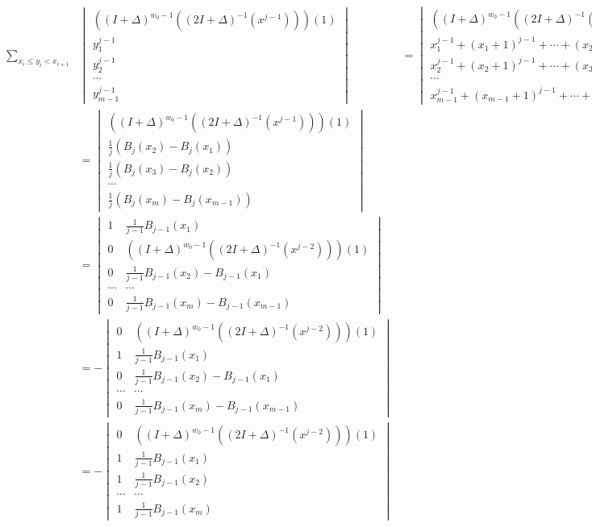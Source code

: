 \documentclass[10pt,reqno]{amsart}
\theoremstyle{plain}
\theoremstyle{definition}
\theoremstyle{remark}
\begin{document}
\begin{align}
\sum_{x_i\leq y_i<x_{i+1}} 
&\begin{vmatrix}
((I+\Delta)^{w_0-1} ((2I+\Delta)^{-1} (x^{j-1})))(1) \\
y_1^{j-1} \\
y_2^{j-1} \\
\dotsb \\
y_{m-1}^{j-1}
\end{vmatrix}\  
&=
\begin{vmatrix}
((I+\Delta)^{w_0-1} ((2I+\Delta)^{-1} (x^{j-1})))(1) \\
x_1^{j-1}+(x_1+1)^{j-1}+\dotsb + (x_2-1)^{j-1} \\
x_2^{j-1}+(x_2+1)^{j-1}+\dotsb + (x_3-1)^{j-1} \\
\dotsb \\
x_{m-1}^{j-1}+(x_{m-1}+1)^{j-1}+\dotsb + (x_m-1)^{j-1} 
\end{vmatrix} \\
&=  
\begin{vmatrix}
((I+\Delta)^{w_0-1} ((2I+\Delta)^{-1} (x^{j-1})))(1) \\
\frac{1}{j} (B_j(x_2) - B_j(x_1)) \\
\frac{1}{j} (B_j(x_3) - B_j(x_2)) \\
\dotsb \\
\frac{1}{j} (B_j(x_m) - B_j(x_{m-1}))
\end{vmatrix} \\
&=
\begin{vmatrix}
1 & \frac{1}{j-1} B_{j-1}(x_1)\\
0 & ((I+\Delta)^{w_0-1} ((2I+\Delta)^{-1} (x^{j-2})))(1) \\
0 & \frac{1}{j-1} B_{j-1}(x_2) - B_{j-1}(x_1)\\
\dotsb & \dotsb \\
0 & \frac{1}{j-1} B_{j-1}(x_m) - B_{j-1}(x_{m-1})
\end{vmatrix} \\
&=
- \begin{vmatrix}
0 & ((I+\Delta)^{w_0-1} ((2I+\Delta)^{-1} (x^{j-2})))(1) \\
1 & \frac{1}{j-1} B_{j-1}(x_1)\\
0 & \frac{1}{j-1} B_{j-1}(x_2) - B_{j-1}(x_1)\\
\dotsb & \dotsb \\
0 & \frac{1}{j-1} B_{j-1}(x_m) - B_{j-1}(x_{m-1})
\end{vmatrix} \\
&= 
- \begin{vmatrix}
0 & ((I+\Delta)^{w_0-1} ((2I+\Delta)^{-1} (x^{j-2})))(1) \\
1 & \frac{1}{j-1} B_{j-1}(x_1)\\
1 & \frac{1}{j-1} B_{j-1}(x_2)\\
\dotsb & \dotsb \\
1 & \frac{1}{j-1} B_{j-1}(x_m)
\end{vmatrix} 
\end{align}
\end{document}
